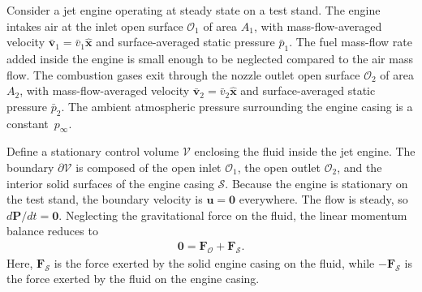 \begin{example}
    Consider a jet engine operating at steady state on a test stand. The engine intakes air at the inlet open surface $\mathcal{O}_1$ of area $A_1$, with mass-flow-averaged velocity $\bar{\bm{v}}_1=\bar{v}_1\bm{\hat{x}}$ and surface-averaged static pressure $\bar{p}_1$. The fuel mass-flow rate added inside the engine is small enough to be neglected compared to the air mass flow. The combustion gases exit through the nozzle outlet open surface $\mathcal{O}_2$ of area $A_2$, with mass-flow-averaged velocity $\bar{\bm{v}}_2=\bar{v}_2\bm{\hat{x}}$ and surface-averaged static pressure $\bar{p}_2$. The ambient atmospheric pressure surrounding the engine casing is a constant~$p_\infty$.

    Define a stationary control volume $\mathcal{V}$ enclosing the fluid inside the jet engine. The boundary $\partial\mathcal{V}$ is composed of the open inlet $\mathcal{O}_1$, the open outlet $\mathcal{O}_2$, and the interior solid surfaces of the engine casing $\mathcal{S}$. Because the engine is stationary on the test stand, the boundary velocity is $\bm{u}=\bm{0}$ everywhere. The flow is steady, so $d\bm{P}/dt=\bm{0}$. Neglecting the gravitational force on the fluid, the linear momentum balance reduces to
    \begin{align*}
        \bm{0}=\bm{F}_\mathcal{O}+\bm{F}_\mathcal{S}.
    \end{align*}
    Here, $\bm{F}_\mathcal{S}$ is the force exerted by the solid engine casing on the fluid, while $-\bm{F}_\mathcal{S}$ is the force exerted by the fluid on the engine casing.


\end{example}
